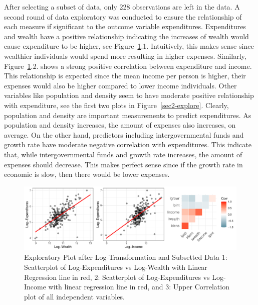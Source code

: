 \documentclass[11pt]{article}\usepackage[]{graphicx}\usepackage[]{color}
\makeatletter
\def\maxwidth{ %
  \ifdim\Gin@nat@width>\linewidth
    \linewidth
  \else
    \Gin@nat@width
  \fi
}
\makeatother
\begin{document}
\noindent After selecting a subset of data, only 228 observations are left in the data. A second round of data exploratory was conducted to ensure the relationship of each measure if significant to the outcome variable expenditures. Expenditures and wealth have a positive relationship indicating the increases of wealth would cause expenditure to be higher, see Figure~\ref{sec-explore}.1. Intuitively, this makes sense since wealthier individuals would spend more resulting in higher expenses. Similarly, Figure~\ref{sec-explore}.2. shows a strong positive correlation between expenditure and income. This relationship is expected since the mean income per person is higher, their expenses would also be higher compared to lower income individuals. Other variables like population and density seem to have moderate positive relationship with expenditure, see the first two plots in Figure~\ref{sec2-explore}. Clearly, population and density are important measurements to predict expenditures. As population and density increases, the amount of expenses also increases, on average. On the other hand, predictors including intergovernmental funds and growth rate have moderate negative correlation with expenditures. This indicate that, while intergovernmental funds and growth rate increases, the amount of expenses should decrease. This makes perfect sense since if the growth rate in economic is slow, then there would be lower expenses.             

\begin{figure}[h!] 
\begin{center}

\includegraphics[width=\maxwidth]{figure/unnamed-chunk-3-1} 

\caption{Exploratory Plot after Log-Transformation and Subsetted Data 1: Scatterplot of Log-Expenditures vs Log-Wealth with Linear Regression line in red, 2: Scatterplot of Log-Expenditures vs Log-Income with linear regression line in red, and 3: Upper Correlation plot of all independent variables.}
\label{sec-explore}
\end{center} 
\end{figure}
\end{document}
